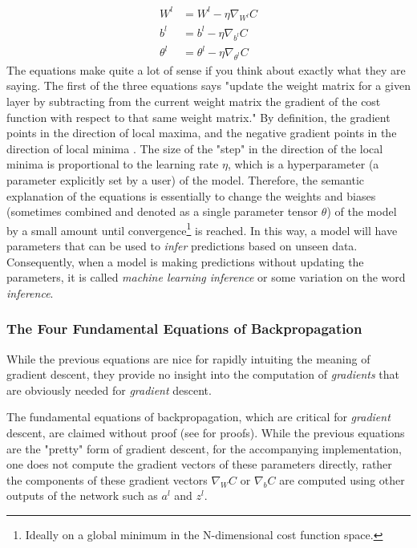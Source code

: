 \documentclass{article}
\begin{document}
\begin{align}
	W^{l}      & = W^{l} - \eta \nabla_{W^{l}}C           \\
	b^{l}      & = b^{l} - \eta \nabla_{b^{l}}C           \\
	\theta^{l} & = \theta^{l} - \eta \nabla_{\theta^{l}}C
\end{align}
The equations make quite a lot of sense if you think about exactly
what they are saying. The first of the three equations says "update the
weight matrix for a given layer by subtracting from the current weight matrix
the gradient of the cost function with respect to that same weight matrix." By definition,
the gradient points in the direction of local maxima, and the
negative gradient points in the direction of local minima \cite{MathLibreGradient2021}.
The size of the "step" in the direction of the local minima
is proportional to the learning rate $\eta$,
which is a hyperparameter (a parameter explicitly set by a user) of the model.
Therefore, the semantic explanation of the equations is essentially to change the
weights and biases (sometimes combined and denoted as a single parameter tensor $\theta$)
of the model by a small amount until convergence\footnote{Ideally
	on a global minimum in the N-dimensional cost function space.} is reached. In this way, a model
will have parameters that can be used to \textit{infer} predictions based on
unseen data. Consequently, when a model is making predictions without
updating the parameters, it is called \textit{machine learning inference} or
some variation on the word \textit{inference}.

\subsubsection{The Four Fundamental Equations of Backpropagation}

\quad While the previous equations are nice for rapidly intuiting the meaning of
gradient descent, they provide no insight into the computation of \textit{gradients}
that are obviously needed for \textit{gradient} descent.

The fundamental equations of backpropagation, which are critical for \textit{gradient}
descent, are claimed without proof (see \cite{Nielsen2015} for proofs). While
the previous equations are the "pretty" form of gradient descent, for the
accompanying implementation, one does not compute the gradient vectors of these parameters
directly, rather the components of these gradient vectors $\nabla_{W}C$ or $\nabla_{b}C$
are computed using other outputs of the network such as $a^{l}$ and $z^{l}$.
\end{document}
